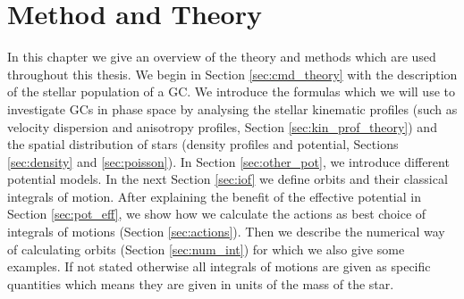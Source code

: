 \section{Method and Theory}\label{sec:method_theory}
In this chapter we give an overview of the theory and methods which are used throughout this thesis. We begin in Section \ref{sec:cmd_theory} with the description of the stellar population of a \ac{GC}. We introduce the formulas which we will use to investigate \acp{GC} in phase space by analysing the stellar kinematic profiles (such as velocity dispersion and anisotropy profiles, Section \ref{sec:kin_prof_theory}) and the spatial distribution of stars (density profiles and potential, Sections \ref{sec:density} and \ref{sec:poisson}). In Section \ref{sec:other_pot}, we introduce different potential models. In the next Section \ref{sec:iof} we define orbits and their classical integrals of motion. After explaining the benefit of the effective potential in Section \ref{sec:pot_eff}, we show how we calculate the actions as best choice of integrals of motions (Section \ref{sec:actions}). Then we describe the numerical way of calculating orbits (Section \ref{sec:num_int}) for which we also give some examples. If not stated otherwise all integrals of motions are given as specific quantities which means they are given in units of the mass of the star.
